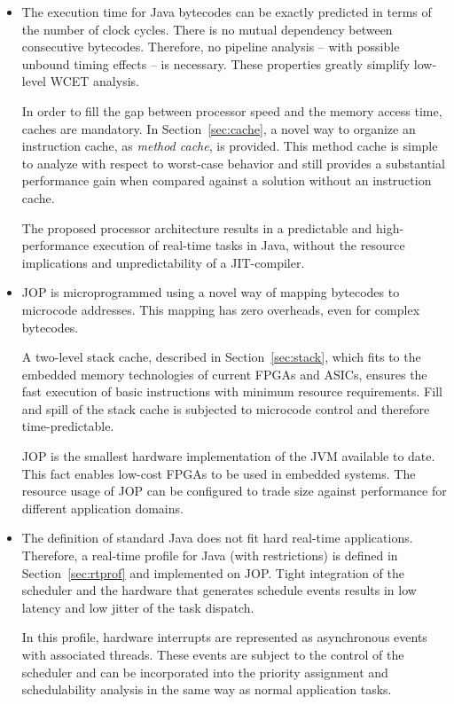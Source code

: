 \begin{itemize}

    \item
The execution time for Java bytecodes can be exactly predicted in
terms of the number of clock cycles.
There is no mutual dependency between consecutive bytecodes.
Therefore, no pipeline analysis -- with possible unbound timing
effects -- is necessary. These properties greatly simplify low-level
WCET analysis.

In order to fill the gap between processor speed and the memory
access time, caches are mandatory. In Section~\ref{sec:cache}, a
novel way to organize an instruction cache, as \emph{method cache},
is provided. This method cache is simple to analyze with respect to
worst-case behavior and still provides a substantial performance
gain when compared against a solution without an instruction cache.

The proposed processor architecture results in a predictable and
high-performance
execution of real-time tasks in Java, without the resource
implications and unpredictability of a JIT-compiler.

    \item
JOP is microprogrammed using a novel way of mapping bytecodes to
microcode addresses. This mapping has zero overheads, even for
complex bytecodes.

A two-level stack cache, described in Section~\ref{sec:stack}, which
fits to the embedded memory technologies of current FPGAs and ASICs,
ensures the fast execution of basic instructions with minimum
resource requirements. Fill and spill of the stack cache is
subjected to microcode control and therefore time-predictable.

JOP is the smallest hardware implementation of the JVM available to
date. This fact enables low-cost FPGAs to be used in embedded
systems. The resource usage of JOP can be configured to trade size
against performance for different application domains.

    \item
The definition of standard Java does not fit hard real-time
applications. Therefore, a real-time profile for Java (with
restrictions) is defined in Section~\ref{sec:rtprof} and implemented
on JOP. Tight integration of the scheduler and the hardware that
generates schedule events results in low latency and low jitter of
the task dispatch.

In this profile, hardware interrupts are represented as asynchronous
events with associated threads. These events are subject to the
control of the scheduler and can be incorporated into the priority
assignment and schedulability analysis in the same way as normal
application tasks.


\end{itemize}
